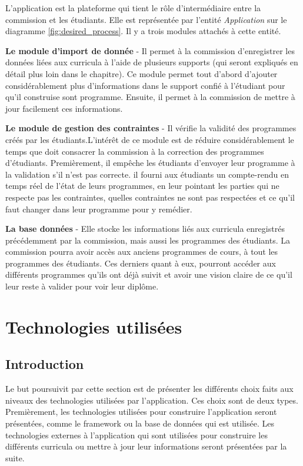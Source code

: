 L'application est la  plateforme qui tient le rôle d'intermédiaire entre la commission et les étudiants. Elle est représentée par l'entité \textit{Application} sur le diagramme \ref{fig:desired_process}. Il y a trois modules attachés à cette entité.

\textbf{Le module d'import de donnée} - Il permet à la commission d'enregistrer les données liées aux curricula  à l'aide de plusieurs supports (qui seront expliqués en détail plus loin dans le chapitre). Ce module permet tout d'abord d'ajouter considérablement plus d'informations dans le support confié à l'étudiant pour qu'il construise sont programme. Ensuite, il permet à la commission de mettre à jour facilement ces informations. 
 
\textbf{Le module de gestion des contraintes} - Il vérifie la validité des programmes créés par les étudiants.L'intérêt de ce module est de réduire considérablement  le temps que doit consacrer la commission à la correction des programmes d'étudiants. Premièrement, il empêche les étudiants d'envoyer leur programme à la validation s'il n'est pas correcte. il fourni aux étudiants un compte-rendu en temps réel de l'état de leurs programmes, en leur pointant les parties qui ne respecte pas les contraintes, quelles contraintes ne sont pas respectées et ce qu'il faut changer dans leur programme pour y remédier.

\textbf{La base données} - Elle stocke les informations liés aux curricula enregistrés précédemment par la commission, mais aussi les programmes des étudiants. La commission pourra avoir accès aux anciens programmes de cours, à tout les programmes des étudiants. Ces derniers quant à eux, pourront accéder aux différents programmes qu'ils ont déjà suivit et avoir une vision claire de ce qu'il leur reste à valider pour voir leur diplôme.

\clearpage
\section{Technologies utilisées}
\subsection{Introduction}
Le but poursuivit par cette section est de présenter les différents choix faits aux niveaux des technologies utilisées par l'application. Ces choix sont de deux types. Premièrement, les technologies utilisées pour construire l'application seront présentées, comme le framework ou la base de données qui est utilisée. Les technologies externes à l'application qui sont utilisées pour construire les différents curricula ou mettre à jour leur informations seront présentées par la suite.

